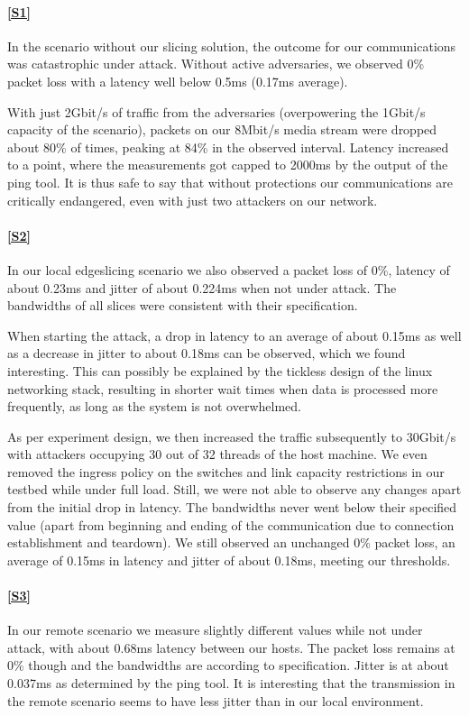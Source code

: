 \begin{description}[style=multiline, labelwidth=0.7cm]
    \paragraph{\ref{S1}} In the scenario without our slicing solution, the outcome for our communications was catastrophic under attack. Without active adversaries, we observed 0\% packet loss with a latency well below 0.5ms (0.17ms average).

    With just 2Gbit/s of traffic from the adversaries (overpowering the 1Gbit/s capacity of the scenario), packets on our 8Mbit/s media stream were dropped about 80\% of times, peaking at 84\% in the observed interval. Latency increased to a point, where the measurements got capped to 2000ms by the output of the ping tool. It is thus safe to say that without protections our communications are critically endangered, even with just two attackers on our network.

    \paragraph{\ref{S2}} In our local edgeslicing scenario we also observed a packet loss of 0\%, latency of about 0.23ms  and jitter of about 0.224ms when not under attack. The bandwidths of all slices were consistent with their specification.

    When starting the attack, a drop in latency to an average of about 0.15ms as well as a decrease in jitter to about 0.18ms can be observed, which we found interesting. This can possibly be explained by the tickless design of the linux networking stack, resulting in shorter wait times when data is processed more frequently, as long as the system is not overwhelmed.

    As per experiment design, we then increased the traffic subsequently to 30Gbit/s with attackers occupying 30 out of 32 threads of the host machine. We even removed the ingress policy on the switches and link capacity restrictions in our testbed while under full load. Still, we were not able to observe any changes apart from the initial drop in latency.
    The bandwidths never went below their specified value (apart from beginning and ending of the communication due to connection establishment and teardown). We still observed an unchanged 0\% packet loss, an average of 0.15ms in latency and jitter of about 0.18ms, meeting our thresholds.

    \paragraph{\ref{S3}} In our remote scenario we measure slightly different values while not under attack, with about 0.68ms latency between our hosts. The packet loss remains at 0\% though and the bandwidths are according to specification. Jitter is at about 0.037ms as determined by the ping tool. It is interesting that the transmission in the remote scenario seems to have less jitter than in our local environment.


\end{description}
